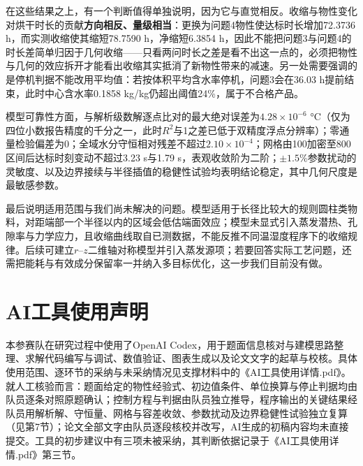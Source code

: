 \documentclass[zihao=-4,UTF8]{ctexart}
\begin{document}
在这些结果之上，有一个判断值得单独说明，因为它与直觉相反。收缩与物性变化对烘干时长的贡献\textbf{方向相反、量级相当}：更换为问题4物性使达标时长增加72.3736 h，而实测收缩使其缩短78.7590 h，净缩短6.3854 h，因此不能把问题3与问题4的时长差简单归因于几何收缩——只看两问时长之差是看不出这一点的，必须把物性与几何的效应拆开才能看出收缩其实抵消了新物性带来的减速。另一处需要强调的是停机判据不能改用平均值：若按体积平均含水率停机，问题3会在36.03 h提前结束，此时中心含水率0.1858 kg/kg仍超出阈值24\%，属于不合格产品。

模型可靠性方面，与解析级数解逐点比对的最大绝对误差为$4.28\times10^{-6}$ °C（仅为四位小数报告精度的千分之一，此时$R^2$与1之差已低于双精度浮点分辨率）；零通量检验偏差为0；全域水分守恒相对残差不超过$2.10\times10^{-4}$；网格由100加密至800区间后达标时刻变动不超过3.23 s与1.79 s，表观收敛阶为二阶；$\pm1.5\%$参数扰动的灵敏度、以及边界接续与半径插值的稳健性试验均表明结论稳定，其中几何尺度是最敏感参数。

最后说明适用范围与我们尚未解决的问题。模型适用于长径比较大的规则圆柱类物料，对距端部一个半径以内的区域会低估端面效应；模型未显式引入蒸发潜热、孔隙率与力学应力，且收缩曲线取自已测数据，不能反推不同温湿度程序下的收缩规律。后续可建立$r$--$z$二维轴对称模型并引入蒸发源项；若要回答实际工艺问题，还需把能耗与有效成分保留率一并纳入多目标优化，这一步我们目前没有做。

\section*{AI工具使用声明}
本参赛队在研究过程中使用了OpenAI Codex，用于题面信息核对与建模思路整理、求解代码编写与调试、数值验证、图表生成以及论文文字的起草与校核。具体使用范围、逐环节的采纳与未采纳情况见支撑材料中的《AI工具使用详情.pdf》。
就人工核验而言：题面给定的物性经验式、初边值条件、单位换算与停止判据均由队员逐条对照原题确认；控制方程与判据由队员独立推导，程序输出的关键结果经队员用解析解、守恒量、网格与容差收敛、参数扰动及边界稳健性试验独立复算（见第7节）；论文全部文字由队员逐段核校并改写，AI生成的初稿内容均未直接提交。工具的初步建议中有三项未被采纳，其判断依据记录于《AI工具使用详情.pdf》第三节。
\end{document}
